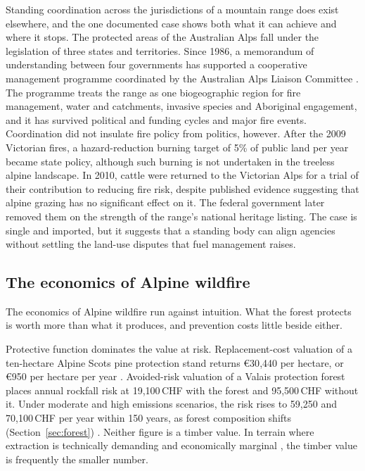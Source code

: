 \documentclass[11pt,a4paper]{article}
\begin{document}
Standing coordination across the jurisdictions of a mountain range does exist elsewhere, and the one documented case shows both what it can achieve and where it stops. The protected areas of the Australian Alps fall under the legislation of three states and territories. Since 1986, a memorandum of understanding between four governments has supported a cooperative management programme coordinated by the Australian Alps Liaison Committee \citep{lockwood_biodiversity_2014}. The programme treats the range as one biogeographic region for fire management, water and catchments, invasive species and Aboriginal engagement, and it has survived political and funding cycles and major fire events. Coordination did not insulate fire policy from politics, however. After the 2009 Victorian fires, a hazard-reduction burning target of 5\% of public land per year became state policy, although such burning is not undertaken in the treeless alpine landscape. In 2010, cattle were returned to the Victorian Alps for a trial of their contribution to reducing fire risk, despite published evidence suggesting that alpine grazing has no significant effect on it. The federal government later removed them on the strength of the range's national heritage listing. The case is single and imported, but it suggests that a standing body can align agencies without settling the land-use disputes that fuel management raises.

\subsection{The economics of Alpine wildfire}
\label{sec:economics}

The economics of Alpine wildfire run against intuition. What the forest protects is worth more than what it produces, and prevention costs little beside either.

Protective function dominates the value at risk. Replacement-cost valuation of a ten-hectare Alpine Scots pine protection stand returns €30{,}440 per hectare, or €950 per hectare per year \citep{accastello_asforesee_2019}. Avoided-risk valuation of a Valais protection forest places annual rockfall risk at 19{,}100\,CHF with the forest and 95{,}500\,CHF without it. Under moderate and high emissions scenarios, the risk rises to 59{,}250 and 70{,}100\,CHF per year within 150 years, as forest composition shifts (Section~\ref{sec:forest}) \citep{moos_climate_2021}. Neither figure is a timber value. In terrain where extraction is technically demanding and economically marginal \citep{dinca_timber_2025}, the timber value is frequently the smaller number.
\end{document}
